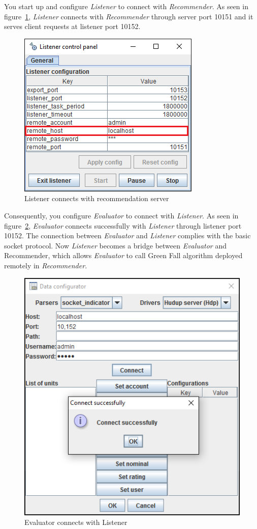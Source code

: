 \documentclass[a4paper,twoside]{article}
\begin{document}
You start up and configure \textit{Listener} to connect with \textit{Recommender}. As seen in figure~\ref{figure:listener}, \textit{Listener} connects with \textit{Recommender} through server port 10151 and it serves client requests at listener port 10152.
\begin{figure}
\centering
\includegraphics{ListenerRecommender.png}
\caption{Listener connects with recommendation server}
\label{figure:listener}
\end{figure}
Consequently, you configure \textit{Evaluator} to connect with \textit{Listener}. As seen in figure~\ref{figure:evaluator-listener}, \textit{Evaluator} connects successfully with \textit{Listener} through listener port 10152. The connection between \textit{Evaluator} and \textit{Listener} complies with the basic socket protocol. Now \textit{Listener} becomes a bridge between \textit{Evaluator} and Recommender, which allows \textit{Evaluator} to call Green Fall algorithm deployed remotely in \textit{Recommender}.
\begin{figure}
\centering
\includegraphics{EvaluatorListener.png}
\caption{Evaluator connects with Listener}
\label{figure:evaluator-listener}
\end{figure}
\end{document}
